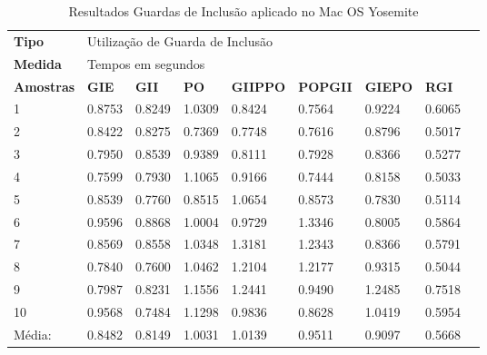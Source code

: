 \begin{apendicesenv}
\begin{table}[!ht]
\centering
\caption{Resultados Guardas de Inclusão aplicado no Mac OS Yosemite}
\label{tab:resutados_guards_de_inclusao:mac}
\begin{tiny}
\begin{tabular}{lp{1cm}p{1cm}p{1cm}p{1cm}p{1cm}p{1cm}p{1cm}p{1cm}}
\textbf{Tipo} & \multicolumn{7}{l}{Utilização de Guarda de Inclusão} \\
\textbf{Medida} & \multicolumn{7}{l}{Tempos em segundos } \\
\textbf{Amostras} & \textbf{GIE} & \textbf{GII} & \textbf{PO} & 
\textbf{GIIPPO} & \textbf{POPGII} & \textbf{GIEPO} & \textbf{RGI} \\ \toprule
 1      & 0.8753 & 0.8249 & 1.0309  & 0.8424  & 0.7564  & 0.9224  & 0.6065  \\ 
 2      & 0.8422 & 0.8275 & 0.7369  & 0.7748  & 0.7616  & 0.8796  & 0.5017  \\ 
 3      & 0.7950 & 0.8539 & 0.9389  & 0.8111  & 0.7928  & 0.8366  & 0.5277  \\ 
 4      & 0.7599 & 0.7930 & 1.1065  & 0.9166  & 0.7444  & 0.8158  & 0.5033  \\ 
 5      & 0.8539 & 0.7760 & 0.8515  & 1.0654  & 0.8573  & 0.7830  & 0.5114  \\ 
 6      & 0.9596 & 0.8868 & 1.0004  & 0.9729  & 1.3346  & 0.8005  & 0.5864  \\ 
 7      & 0.8569 & 0.8558 & 1.0348  & 1.3181  & 1.2343  & 0.8366  & 0.5791  \\ 
 8      & 0.7840 & 0.7600 & 1.0462  & 1.2104  & 1.2177  & 0.9315  & 0.5044  \\ 
 9      & 0.7987 & 0.8231 & 1.1556  & 1.2441  & 0.9490  & 1.2485  & 0.7518  \\ 
 10     & 0.9568 & 0.7484 & 1.1298  & 0.9836  & 0.8628  & 1.0419  & 0.5954  \\ \bottomrule
 Média: & 0.8482 & 0.8149 & 1.0031  & 1.0139  & 0.9511  & 0.9097  & 0.5668  \\ 
\end{tabular}
\end{tiny}
\end{table}


\end{apendicesenv}
